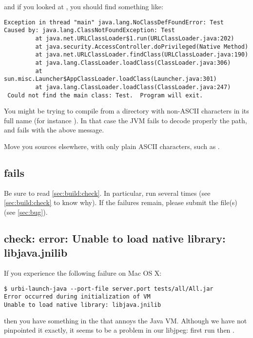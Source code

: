\noindent
and if you looked at , you should find something like:

\begin{verbatim}
Exception in thread "main" java.lang.NoClassDefFoundError: Test
Caused by: java.lang.ClassNotFoundException: Test
         at java.net.URLClassLoader$1.run(URLClassLoader.java:202)
         at java.security.AccessController.doPrivileged(Native Method)
         at java.net.URLClassLoader.findClass(URLClassLoader.java:190)
         at java.lang.ClassLoader.loadClass(ClassLoader.java:306)
         at sun.misc.Launcher$AppClassLoader.loadClass(Launcher.java:301)
         at java.lang.ClassLoader.loadClass(ClassLoader.java:247)
 Could not find the main class: Test.  Program will exit.
\end{verbatim}

You might be trying to compile \usdk from a directory with non-ASCII
characters in its full name (for instance
).  In that case the JVM fails to
decode properly the path, and  fails with the above
message.

Move you sources elsewhere, with only plain ASCII characters, such as
.

\subsection{ fails}

Be sure to read \autoref{sec:build:check}.  In particular, run  several times (see \autoref{sec:build:check} to know why).  If the
failures remain, please submit the  file(s) (see
\autoref{sec:bug}).

\subsection{check: error: Unable to load native library: libjava.jnilib}
\label{sec:faq:jnilib}

If you experience the following failure on Mac OS X:

\begin{verbatim}
$ urbi-launch-java --port-file server.port tests/all/All.jar
Error occurred during initialization of VM
Unable to load native library: libjava.jnilib
\end{verbatim}

\noindent
then you have something in the  that annoys the
Java VM.  Although we have not pinpointed it exactly, it seems to be a
problem in our libjpeg: first run  then
.


